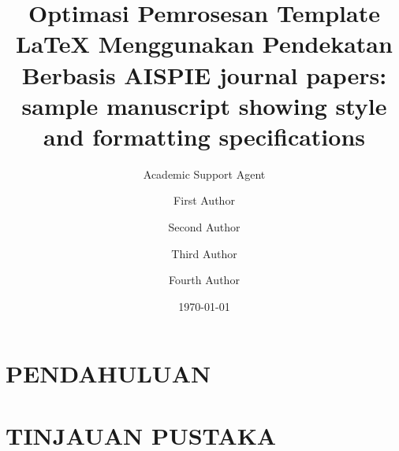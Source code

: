 \documentclass{spieman}
\title{Optimasi Pemrosesan Template LaTeX Menggunakan Pendekatan Berbasis AI}
\author{Academic Support Agent}
\date{\today}
\begin{document}
\maketitle

\begin{abstract}

\end{abstract}

\chapter{PENDAHULUAN}


\chapter{TINJAUAN PUSTAKA}


\usepackage{amsmath,amsfonts,amssymb}
\usepackage{graphicx}
\usepackage{setspace}
\usepackage{tocloft}
\usepackage{lineno}
\linenumbers
\title{SPIE journal papers: sample manuscript showing style and formatting specifications}

\author[a]{First Author}
\author[a]{Second Author}
\author[b]{Third Author}
\author[a,b,*]{Fourth Author}
\end{document}

